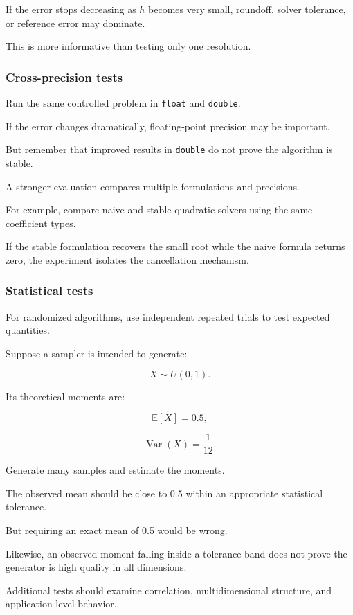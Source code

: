 If the error stops decreasing as \(h\) becomes very small, roundoff, solver tolerance, or reference error may dominate.

This is more informative than testing only one resolution.

\subsubsection{Cross-precision tests}\label{02-foundations-ii-ch031-cross-precision-tests}

Run the same controlled problem in \texttt{float} and \texttt{double}.

If the error changes dramatically, floating-point precision may be important.

But remember that improved results in \texttt{double} do not prove the algorithm is stable.

A stronger evaluation compares multiple formulations and precisions.

For example, compare naive and stable quadratic solvers using the same coefficient types.

If the stable formulation recovers the small root while the naive formula returns zero, the experiment isolates the cancellation mechanism.

\subsubsection{Statistical tests}\label{02-foundations-ii-ch031-statistical-tests}

For randomized algorithms, use independent repeated trials to test expected quantities.

Suppose a sampler is intended to generate:

\[ X\sim U(0,1). \]

Its theoretical moments are:

\[ \mathbb E[X]=0.5, \]

\[ \operatorname{Var}(X)=\frac1{12}. \]

Generate many samples and estimate the moments.

The observed mean should be close to 0.5 within an appropriate statistical tolerance.

But requiring an exact mean of 0.5 would be wrong.

Likewise, an observed moment falling inside a tolerance band does not prove the generator is high quality in all dimensions.

Additional tests should examine correlation, multidimensional structure, and application-level behavior.

